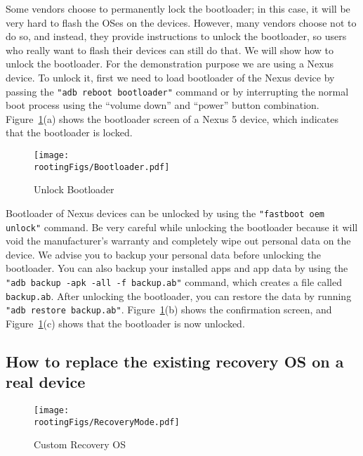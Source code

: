 Some vendors choose to permanently lock the bootloader; in this case, it
will be very hard to flash the OSes on the devices. However,  
many vendors choose not to do so, and instead, they 
provide instructions to unlock the bootloader, so users who really want to
flash their devices can still do that. We will show how to unlock the
bootloader. For the demonstration purpose we are using a Nexus device.
To unlock it, first we need to load
bootloader of the Nexus device by passing the \texttt{"adb reboot
bootloader"} command or by interrupting the normal boot process using 
the ``volume down'' and ``power'' button combination.
Figure~\ref{fig:rooting:bootloader}(a)  shows the bootloader screen of
a Nexus 5 device, which indicates that the bootloader is
locked.

\begin{figure}[htb]
	\begin{center}
		\texttt{[image: \\rootingFigs/Bootloader.pdf]}
	\end{center}
	\caption{Unlock Bootloader}
	\label{fig:rooting:bootloader}
\end{figure}


Bootloader of Nexus devices can be unlocked by using the 
\texttt{"fastboot oem unlock"} command. 
Be very careful while unlocking the bootloader because it
will void the manufacturer's warranty and completely wipe out 
personal data on the device. We advise you to backup your personal data before
unlocking the bootloader. You can also backup your installed apps
and app data by using the \texttt{"adb backup -apk -all -f backup.ab"}
command, which creates a file called \texttt{backup.ab}. 
After unlocking the bootloader, you can restore the data by running 
\texttt{"adb restore backup.ab"}. 
Figure~\ref{fig:rooting:bootloader}(b) shows the confirmation screen, and 
Figure~\ref{fig:rooting:bootloader}(c) shows that the bootloader is now
unlocked. 




\subsection{How to replace the existing recovery OS on a real device}


\begin{figure}[htb]
	\begin{center}
		\texttt{[image: \\rootingFigs/RecoveryMode.pdf]}
	\end{center}
	\caption{Custom Recovery OS}
	\label{fig:root:customRecoveryMode}
\end{figure}
 

